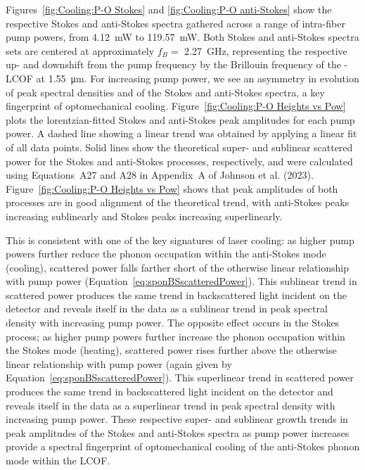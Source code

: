Figures~\ref{fig:Cooling:P-O Stokes} and \ref{fig:Cooling:P-O anti-Stokes} show the respective Stokes and anti-Stokes spectra gathered across a range of intra-fiber pump powers, from \SI{4.12}{\milli\watt} to \SI{119.57}{\milli\watt}. Both Stokes and anti-Stokes spectra sets are centered at approximately \(f_{B} = \) \SI{2.27}{\giga\hertz}, representing the respective up- and downshift from the pump frequency by the Brillouin frequency of the -\ac{LCOF} at \SI{1.55}{\micro\meter}. For increasing pump power, we see an asymmetry in evolution of peak spectral densities and of the Stokes and anti-Stokes spectra, a key fingerprint of optomechanical cooling. Figure~\ref{fig:Cooling:P-O Heights vs Pow} plots the lorentzian-fitted Stokes and anti-Stokes peak amplitudes for each pump power. A dashed line showing a linear trend was obtained by applying a linear fit of all data points. Solid lines show the theoretical super- and sublinear scattered power for the Stokes and anti-Stokes processes, respectively, and were calculated using Equations~A27 and A28 in Appendix~A of Johnson et al. (2023)\cite{johnson2023laser}. Figure~\ref{fig:Cooling:P-O Heights vs Pow} shows that peak amplitudes of both processes are in good alignment of the theoretical trend, with anti-Stokes peaks increasing sublinearly and Stokes peaks increasing superlinearly.

This is consistent with one of the key signatures of laser cooling: as higher pump powers further reduce the phonon occupation within the anti-Stokes mode (cooling), scattered power falls farther short of the otherwise linear relationship with pump power (Equation~\ref{eq:sponBSscatteredPower}). This sublinear trend in scattered power produces the same trend in backscattered light incident on the detector and reveals itself in the data as a sublinear trend in peak spectral density with increasing pump power. The opposite effect occurs in the Stokes process; as higher pump powers further increase the phonon occupation within the Stokes mode (heating), scattered power rises further above the otherwise linear relationship with pump power (again given by Equation~\ref{eq:sponBSscatteredPower}). This superlinear trend in scattered power produces the same trend in backscattered light incident on the detector and reveals itself in the data as a superlinear trend in peak spectral density with increasing pump power. These respective super- and sublinear growth trends in peak amplitudes of the Stokes and anti-Stokes spectra as pump power increases provide a spectral fingerprint of optomechanical cooling of the anti-Stokes phonon mode within the \ac{LCOF}.

